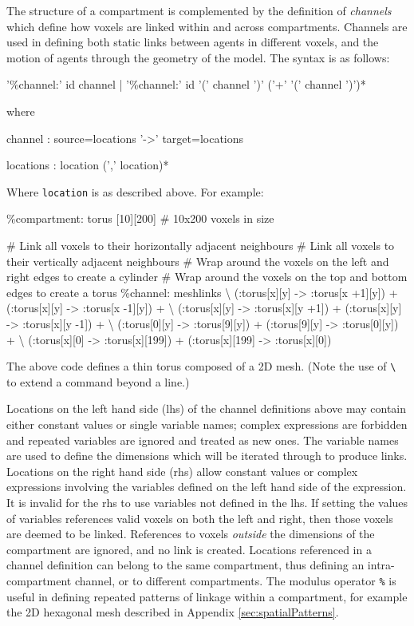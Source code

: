 \documentclass[english]{report}
\begin{document}
The structure of a compartment is complemented by the definition of \emph{channels} which define how voxels are linked within and across compartments. Channels are used in defining both static links between agents in different voxels, and the motion of agents through the geometry of the model. The syntax is as follows:
\begin{bnfsource}
'\%channel:' id channel 
| '\%channel:' id '(' channel ')' ('+' '(' channel ')')*
\end{bnfsource}
where
\begin{bnfsource}
channel :
  source=locations '->' target=locations

locations :
  location (',' location)*
\end{bnfsource}
Where \verb|location| is as described above. For example:
\begin{kappasource}
\%compartment: torus [10][200]    # 10x200 voxels in size

# Link all voxels to their horizontally adjacent neighbours
# Link all voxels to their vertically adjacent neighbours
# Wrap around the voxels on the left and right edges to create a cylinder
# Wrap around the voxels on the top and bottom edges to create a torus
\%channel: meshlinks {\textbackslash}
    (:torus[x][y] -> :torus[x +1][y]) + (:torus[x][y]   -> :torus[x -1][y]) + {\textbackslash}
    (:torus[x][y] -> :torus[x][y +1]) + (:torus[x][y]   -> :torus[x][y -1]) + {\textbackslash}
    (:torus[0][y] -> :torus[9][y])    + (:torus[9][y]   -> :torus[0][y])    + {\textbackslash}
    (:torus[x][0] -> :torus[x][199])  + (:torus[x][199] -> :torus[x][0])
\end{kappasource}

The above code defines a thin torus composed of a 2D mesh. (Note the use of \Verb+\+ to extend a command beyond a line.)

Locations on the left hand side (lhs) of the channel definitions above may contain either constant values or single variable names; complex expressions are forbidden and repeated variables are ignored and treated as new ones. The variable names are used to define the dimensions which will be iterated through to produce links. Locations on the right hand side (rhs) allow constant values or complex expressions involving the variables defined on the left hand side of the expression. It is invalid for the rhs to use variables not defined in the lhs. If setting the values of variables references valid voxels on both the left and right, then those voxels are deemed to be linked. References to voxels \emph{outside} the dimensions of the compartment are ignored, and no link is created. Locations referenced in a channel definition can belong to the same compartment, thus defining an intra-compartment channel, or to different compartments. The modulus operator \Verb+%+ 
is useful in defining repeated patterns of linkage within a compartment, for example the 2D hexagonal mesh described in Appendix \ref{sec:spatialPatterns}.
\end{document}
